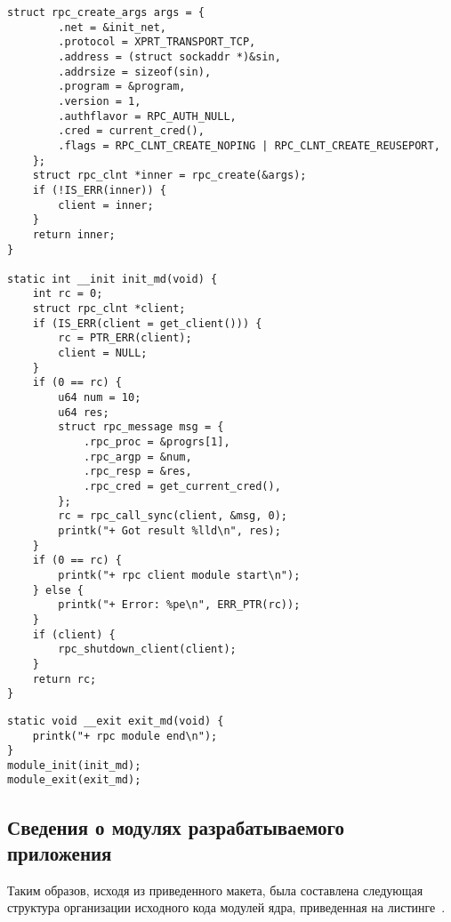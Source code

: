 \clearpage
\begin{lstlisting}[caption={Прототип клиента (часть 3)}, label={lst:client_prototype3}]
    struct rpc_create_args args = {
        .net = &init_net,
        .protocol = XPRT_TRANSPORT_TCP,
        .address = (struct sockaddr *)&sin,
        .addrsize = sizeof(sin),
        .program = &program,
        .version = 1,
        .authflavor = RPC_AUTH_NULL,
        .cred = current_cred(),
        .flags = RPC_CLNT_CREATE_NOPING | RPC_CLNT_CREATE_REUSEPORT,
    };
    struct rpc_clnt *inner = rpc_create(&args);
    if (!IS_ERR(inner)) {
        client = inner;
    }
    return inner;
}

static int __init init_md(void) {
    int rc = 0;
    struct rpc_clnt *client;
    if (IS_ERR(client = get_client())) {
        rc = PTR_ERR(client);
        client = NULL;
    }
    if (0 == rc) {
        u64 num = 10;
        u64 res;
        struct rpc_message msg = {
            .rpc_proc = &progrs[1],
            .rpc_argp = &num,
            .rpc_resp = &res,
            .rpc_cred = get_current_cred(),
        };
        rc = rpc_call_sync(client, &msg, 0);
        printk("+ Got result %lld\n", res);
    }
    if (0 == rc) {
        printk("+ rpc client module start\n");
    } else {
        printk("+ Error: %pe\n", ERR_PTR(rc));
    }
    if (client) {
        rpc_shutdown_client(client);
    }
    return rc;
}
\end{lstlisting}
\clearpage
\begin{lstlisting}[caption={Прототип клиента (часть 4)}, label={lst:client_prototype4}]
static void __exit exit_md(void) {
    printk("+ rpc module end\n");
}
module_init(init_md);
module_exit(exit_md);
\end{lstlisting}

\subsection{Сведения о модулях разрабатываемого приложения}

Таким образов, исходя из приведенного макета, была составлена следующая
структура организации исходного кода модулей ядра, приведенная на
листинге~.

